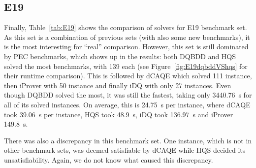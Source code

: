 \documentclass[
  digital, %
  color,
  twoside, %
  table,   %
  nolof,     %
  nolot,     %
]{fithesis3}
\theoremstyle{definition}
\theoremstyle{remark}
\begin{document}
\subsection{E19}
Finally, Table~\ref{tab:E19} shows the comparison of solvers for E19 benchmark set. As this set is a combination of previous sets (with also some new benchmarks), it is the most interesting for ``real'' comparison. However, this set is still dominated by PEC benchmarks, which shows up in the results: both DQBDD and HQS solved the most benchmarks, with 139 each (see Figure~\ref{fig:E19dqbddVShqs} for their runtime comparison). This is followed by dCAQE which solved 111 instance, then iProver with 50 instance and finally iDQ with only 27 instances. Even though DQBDD solved the most, it was still the fastest, taking only \SI{3440.76}{s} for all of its solved instances. On average, this is \SI{24.75}{s} per instance, where dCAQE took \SI{39.06}{s} per instance, HQS took \SI{48.9}{s}, iDQ took \SI{136.97}{s} and iProver \SI{149.8}{s}.

There was also a discrepancy in this benchmark set. One instance, which is not in other benchmark sets, was deemed satisfiable by dCAQE while HQS decided its unsatisfiability. Again, we do not know what caused this discrepancy.
\end{document}
